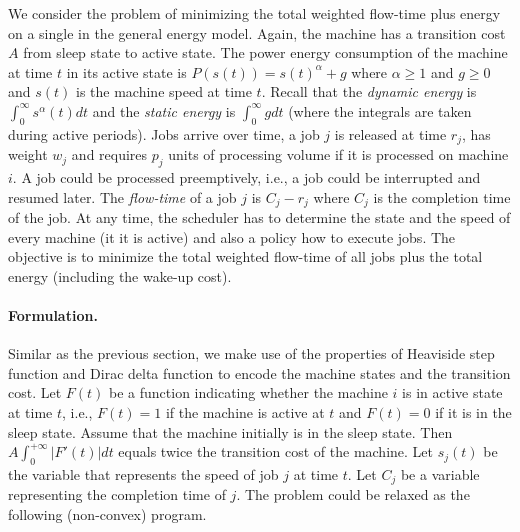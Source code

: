 \documentclass[11pt]{article}
\begin{document}
We consider the problem of minimizing the total weighted flow-time
plus energy on a single in the general energy model. 
Again, the machine has a transition cost $A$ from sleep state to active state.
The power energy consumption of the machine at time $t$ in its active state is 
$P(s(t)) = s(t)^{\alpha} + g$
where $\alpha \geq 1$ and $g \geq 0$ and $s(t)$ is the machine speed at time $t$. 
Recall that the \emph{dynamic energy} is 
$\int_{0}^{\infty} s^{\alpha}(t)dt$ and the \emph{static energy} is
$\int_{0}^{\infty}g dt$ (where the integrals are taken during
active periods).
Jobs arrive over time, a job $j$ is released at time $r_{j}$, has weight $w_{j}$ 
and requires $p_{j}$ units of processing volume if it is processed 
on machine $i$. A job could be processed preemptively, i.e., a job could be interrupted and resumed later. 
The \emph{flow-time} of a job $j$ is $C_{j} - r_{j}$ where
$C_{j}$ is the completion time of the job.
At any time, the scheduler has to determine the state and the speed of every machine (it it is active) 
and also a policy how to execute jobs.
The objective is to minimize the total weighted flow-time of all jobs plus the total 
energy (including the wake-up cost). 

\paragraph{Formulation.} Similar as the previous section, we 
make use of the properties of Heaviside step function and Dirac delta function to encode 
the machine states and the transition cost. Let $F(t)$ be a function
indicating whether the machine $i$ is in active state at time $t$, i.e., $F(t) = 1$ if 
the machine is active at $t$ and $F(t) = 0$ if it is in the sleep state. 
Assume that the machine initially is in the sleep state. Then
$A \int_{0}^{+\infty} |F'(t)|dt$ equals twice the transition cost
of the machine.
Let $s_{j}(t)$ be the variable that represents 
the speed of job $j$ at time $t$. Let $C_{j}$ be 
a variable representing the completion time of $j$. 
The problem could be relaxed as the following (non-convex) program.
\end{document}
